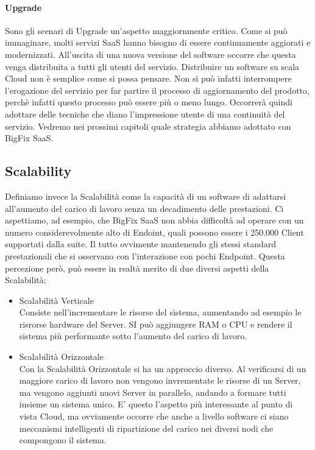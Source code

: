 \paragraph{Upgrade}
Sono gli scenari di Upgrade un'aspetto maggiornmente critico. Come si può immaginare, molti servizi SaaS hanno bisogno di essere continuamente aggiorati e modernizzati. All'uscita di una nuova versione del software occorre che questa venga distribuita a tutti gli utenti del servizio. Distribuire un software su scala Cloud non è semplice come si possa pensare. Non si può infatti interrompere l'erogazione del servizio per far partire il processo di aggiornamento del prodotto, perchè infatti questo processo può essere più o meno lungo. Occorrerà quindi adottare delle tecniche che diano l'impressione utente di una continuità del servizio. Vedremo nei prossimi capitoli quale strategia abbiamo adottato con BigFix SaaS. 

\subsection{Scalability}
Definiamo invece la Scalabilità come la capacità di un software di adattarsi all'aumento del carico di lavoro senza un decadimento delle prestazioni. Ci aspettiamo, ad esempio, che BigFix SaaS non abbia difficoltà ad operare con un numero considerevolmente alto di Endoint, quali possono essere i 250.000 Client supportati dalla suite. Il tutto ovvimente mantenendo gli stessi standard prestazionali che si osservano con l'interazione con pochi Endpoint. Questa percezione però, può essere in realtà merito di due diversi aspetti della Scalabilità:
\begin{itemize}
	\item  Scalabilità Verticale \\
	Consiste nell'incrementare le risorse del sistema, aumentando ad esempio le risrorse hardware del Server. SI può aggiungere RAM o CPU e rendere il sistema più performante sotto l'aumento del carico di lavoro.
	
	\item  Scalabilità Orizzontale \\
	Con la Scalabilità Orizzontale si ha un approccio diverso. Al verificarsi di un maggiore carico di lavoro non vengono invrementate le risorse di un Server, ma vengono aggiunti nuovi Server in parallelo, andando a formare tutti insieme un sistema unico. E' questo l'aspetto più interessante al punto di vista Cloud, ma ovviamente occorre che anche a livello software ci siano meccanismi intelligenti di ripartizione del carico nei diversi nodi che  compongono il sistema.
\end{itemize}

